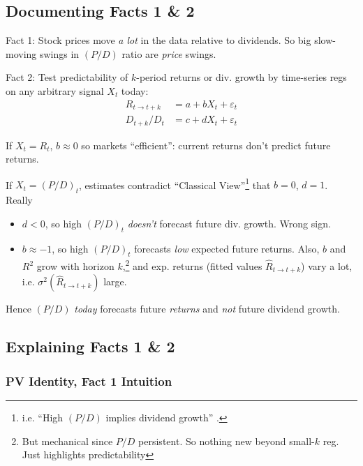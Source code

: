 \documentclass[12pt]{article}
\theoremstyle{plain}
\theoremstyle{definition}
\theoremstyle{remark}
\newcommand{\ra}{\rightarrow}
\begin{document}
\begin{multicols*}{2}
\subsection{Documenting Facts 1 \& 2}
\label{sec:predictability}

Fact 1: Stock prices move \emph{a lot} in the data relative to
dividends.  So big slow-moving swings in $(P/D)$ ratio are \emph{price}
swings.

Fact 2:
Test predictability of $k$-period returns or div. growth by time-series
regs on any arbitrary signal $X_t$ today:
\begin{align*}
  R_{t\ra t+k} &= a + bX_t + \varepsilon_t \\
  D_{t+k}/D_t &= c + dX_t + \varepsilon_t
\end{align*}

If $X_t=R_t$, $b\approx 0$ so
markets ``efficient'': current returns don't predict future returns.

If $X_t=(P/D)_t$, estimates contradict ``Classical
View''\footnote{%
  i.e. ``High $(P/D)$ implies dividend growth'' .
}
that $b=0$, $d=1$. Really
\begin{itemize}
  \item
    $d<0$, so high $(P/D)_t$ \emph{doesn't} forecast future div. growth.
    Wrong sign.
  \item
    $b\approx -1$, so
    high $(P/D)_t$ forecasts \emph{low} expected future returns.
    Also, $b$ and $R^2$ grow with horizon $k$,\footnote{%
      But mechanical since $P/D$ persistent.
      So nothing new beyond small-$k$ reg.
      Just highlights predictability
    }
    and exp. returns (fitted values $\hat{R}_{t\ra t+k}$) vary a
    lot, i.e.  $\sigma^2(\hat{R}_{t\ra t+k})$ large.
\end{itemize}
Hence $(P/D)$ \emph{today} forecasts future \emph{returns} and
\emph{not} future dividend growth.


\columnbreak
\subsection{Explaining Facts 1 \& 2}

\subsubsection{PV Identity, Fact 1 Intuition}


\end{multicols*}
\end{document}
